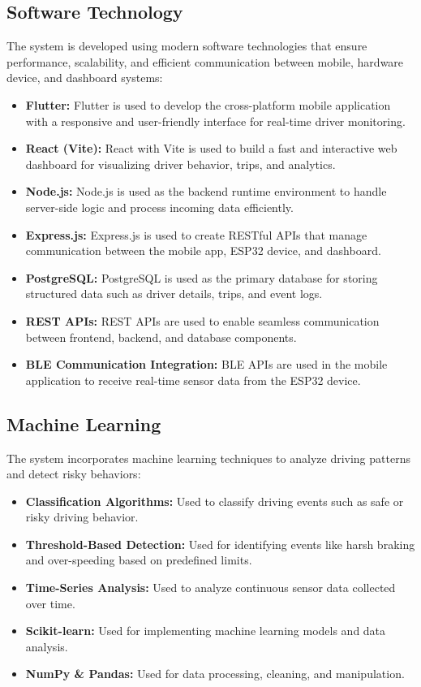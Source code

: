 \subsection{Software Technology}
The system is developed using modern software technologies that ensure performance, scalability, and efficient communication between mobile, hardware device, and dashboard systems:
\begin{itemize}
    \item \textbf{Flutter:} Flutter is used to develop the cross-platform mobile application with a responsive and user-friendly interface for real-time driver monitoring.
    \item \textbf{React (Vite):} React with Vite is used to build a fast and interactive web dashboard for visualizing driver behavior, trips, and analytics.
    \item \textbf{Node.js:} Node.js is used as the backend runtime environment to handle server-side logic and process incoming data efficiently.
    \item \textbf{Express.js:} Express.js is used to create RESTful APIs that manage communication between the mobile app, ESP32 device, and dashboard.
    \item \textbf{PostgreSQL:} PostgreSQL is used as the primary database for storing structured data such as driver details, trips, and event logs.
    \item \textbf{REST APIs:} REST APIs are used to enable seamless communication between frontend, backend, and database components.
    \item \textbf{BLE Communication Integration:} BLE APIs are used in the mobile application to receive real-time sensor data from the ESP32 device.
\end{itemize}

\subsection{Machine Learning}
The system incorporates machine learning techniques to analyze driving patterns and detect risky behaviors:
\begin{itemize}
    \item \textbf{Classification Algorithms:} Used to classify driving events such as safe or risky driving behavior.
    \item \textbf{Threshold-Based Detection:} Used for identifying events like harsh braking and over-speeding based on predefined limits.
    \item \textbf{Time-Series Analysis:} Used to analyze continuous sensor data collected over time.
    \item \textbf{Scikit-learn:} Used for implementing machine learning models and data analysis.
    \item \textbf{NumPy \& Pandas:} Used for data processing, cleaning, and manipulation.
\end{itemize}

